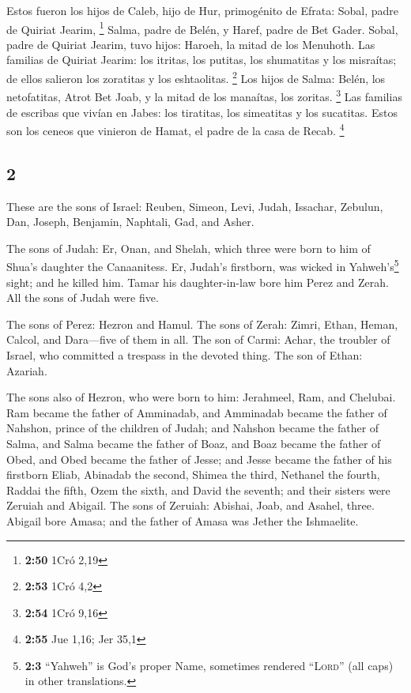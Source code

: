 \begin{paracol}{2}
 Estos fueron los hijos de Caleb, hijo de Hur,
primogénito de Efrata: Sobal, padre de Quiriat Jearim, \footnote{\textbf{2:50}
  1Cró 2,19}  Salma, padre de Belén, y Haref, padre de
Bet Gader.  Sobal, padre de Quiriat Jearim, tuvo hijos:
Haroeh, la mitad de los Menuhoth.  Las familias de
Quiriat Jearim: los itritas, los putitas, los shumatitas y los
misraítas; de ellos salieron los zoratitas y los eshtaolitas.
\footnote{\textbf{2:53} 1Cró 4,2}  Los hijos de Salma:
Belén, los netofatitas, Atrot Bet Joab, y la mitad de los manaítas, los
zoritas. \footnote{\textbf{2:54} 1Cró 9,16}  Las familias
de escribas que vivían en Jabes: los tiratitas, los simeatitas y los
sucatitas. Estos son los ceneos que vinieron de Hamat, el padre de la
casa de Recab. \footnote{\textbf{2:55} Jue 1,16; Jer 35,1}

\switchcolumn
\begin{otherlanguage}{english}

\hypertarget{section-3}{%
\section{2}\label{section-3}}

 These are the sons of Israel: Reuben, Simeon, Levi,
Judah, Issachar, Zebulun,  Dan, Joseph, Benjamin,
Naphtali, Gad, and Asher.

 The sons of Judah: Er, Onan, and Shelah, which three were
born to him of Shua's daughter the Canaanitess. Er, Judah's firstborn,
was wicked in Yahweh's\footnote{\textbf{2:3} ``Yahweh'' is God's proper
  Name, sometimes rendered ``\textsc{Lord}'' (all caps) in other
  translations.} sight; and he killed him.  Tamar his
daughter-in-law bore him Perez and Zerah. All the sons of Judah were
five.

 The sons of Perez: Hezron and Hamul.  The
sons of Zerah: Zimri, Ethan, Heman, Calcol, and Dara---five of them in
all.  The son of Carmi: Achar, the troubler of Israel, who
committed a trespass in the devoted thing.  The son of
Ethan: Azariah.

 The sons also of Hezron, who were born to him: Jerahmeel,
Ram, and Chelubai.  Ram became the father of Amminadab,
and Amminadab became the father of Nahshon, prince of the children of
Judah;  and Nahshon became the father of Salma, and Salma
became the father of Boaz,  and Boaz became the father of
Obed, and Obed became the father of Jesse;  and Jesse
became the father of his firstborn Eliab, Abinadab the second, Shimea
the third,  Nethanel the fourth, Raddai the fifth,
 Ozem the sixth, and David the seventh; 
and their sisters were Zeruiah and Abigail. The sons of Zeruiah:
Abishai, Joab, and Asahel, three.  Abigail bore Amasa;
and the father of Amasa was Jether the Ishmaelite.


\end{otherlanguage}
\end{paracol}
